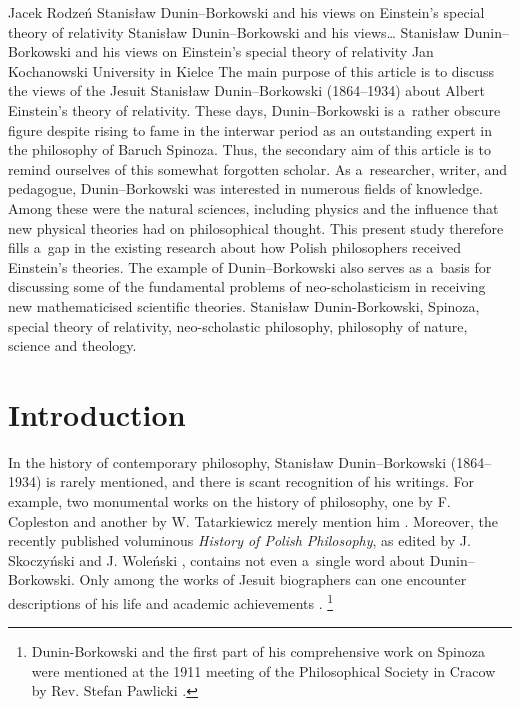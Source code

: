 \begin{artengenv}{Jacek Rodzeń}
	{Stanisław Dunin--Borkowski and his views on Einstein's special theory of relativity}
	{Stanisław Dunin--Borkowski and his views\ldots}
	{Stanisław Dunin--Borkowski and his views on Einstein's special theory of relativity}
	{Jan Kochanowski University in Kielce}
	{The main purpose of this article is to discuss the views of the Jesuit Stanisław Dunin–Borkowski (1864–1934) about Albert Einstein's theory of relativity. These days, Dunin–Borkowski is a~rather obscure figure despite rising to fame in the interwar period as an outstanding expert in the philosophy of Baruch Spinoza. Thus, the secondary aim of this article is to remind ourselves of this somewhat forgotten scholar. As a~researcher, writer, and pedagogue, Dunin–Borkowski was interested in numerous fields of knowledge. Among these were the natural sciences, including physics and the influence that new physical theories had on philosophical thought. This present study therefore fills a~gap in the existing research about how Polish philosophers received Einstein's theories. The example of Dunin–Borkowski also serves as a~basis for discussing some of the fundamental problems of neo-scholasticism in receiving new mathematicised scientific theories.}
	{Stanisław Dunin-Borkowski, Spinoza, special theory of relativity, neo-scholastic philosophy, philosophy of nature, science and theology.}





\section{Introduction}
\lettrine[loversize=0.13,lines=2,lraise=-0.01,nindent=0em,findent=0.2pt]%
{I}{}n the history of contemporary philosophy, Stanisław Dunin–Borkowski (1864–1934) is rarely mentioned, and there is scant recognition of his writings. For example, two monumental works on the history of philosophy, one by F. Copleston
%
 and another by W. Tatarkiewicz 
 merely mention him
 \parencites[][p.209]{copleston_history_1994}[][p.365]{tatarkiewicz_historia_1998}. %
 Moreover, the recently published voluminous \textit{History of Polish Philosophy}, as edited by J. Skoczyński and J. Woleński 
\parencite*[][]{skoczynski_historia_2010}, %
 contains not even a~single word about Dunin–Borkowski. Only among the works of Jesuit biographers can one encounter descriptions of his life and academic achievements 
\parencites[cf.][]{siwek_stanislaw_1935}[][]{pummerer_p_1935}[][pp.103–104]{darowski_filozofia_2001}.%
\footnote{Dunin-Borkowski and the first part of his comprehensive work on Spinoza were mentioned at the 1911 meeting of the Philosophical Society in Cracow by Rev. Stefan Pawlicki 
\parencite*[][pp.13–14]{pawlicki_spinoza_1912}.%
}


\end{artengenv}

